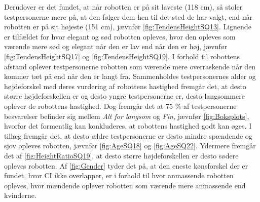 Derudover er det fundet, at når robotten er på sit laveste (118 cm), så stoler testpersonerne mere på, at den følger dem hen til det sted de har valgt, end når robotten er på sit højeste (151 cm), jævnfør \autoref{fig:TendensHeightSQ13}. Lignende er tilfældet for hvor elegant og sød robotten opleves, hvor den opleves som værende mere sød og elegant når den er lav end når den er høj, jævnfør \autoref{fig:TendensHeightSQ17} og \autoref{fig:TendensHeightSQ19}. I forhold til robottens afstand oplever testpersonerne robotten som værende mere overraskende når den kommer tæt på end når den er langt fra. Sammenholdes testpersonernes alder og højdeforskel med deres vurdering af robottens hastighed fremgår det, at desto større højdeforskellen er og desto yngre testpersonerne er, desto langsommere oplever de robottens hastighed. Dog fremgår det at 75 \% af testpersonerne besvarelser befinder sig mellem \textit{Alt for langsom} og \textit{Fin}, jævnfør \autoref{fig:Boksplots}, hvorfor det formentlig kan konkluderes, at robottens hastighed godt kan øges. I tillæg fremgår det, at desto ældre testpersonerne er desto mindre spændende og sjov opleves robotten, jævnfør \autoref{fig:AgeSQ18} og \autoref{fig:AgeSQ22}. Ydermere fremgår det af \autoref{fig:HeightRatioSQ19}, at desto større højdeforskellen er desto sødere opleves robotten. Af \autoref{fig:Gender} tyder det på, at den eneste kønsforskel der er fundet, hvor CI ikke overlapper, er i forhold til hvor anmassende robotten opleves, hvor mændende oplever robotten som værende mere anmassende end kvinderne.
